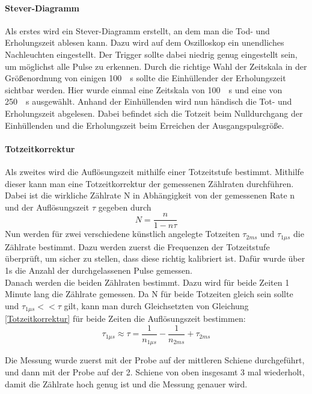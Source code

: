 \documentclass[12pt,a4paper]{article}
\begin{document}
\paragraph{Stever-Diagramm}
Als erstes wird ein Stever-Diagramm erstellt, an dem man die Tod- und Erholungszeit ablesen kann. Dazu wird auf dem Oszilloskop ein unendliches Nachleuchten eingestellt. Der Trigger sollte dabei niedrig genug eingestellt sein, um möglichst alle Pulse zu erkennen. Durch die richtige Wahl der Zeitskala in der Größenordnung von einigen \SI{100}{\mu s} sollte die Einhüllender der Erholungszeit sichtbar werden. Hier wurde einmal eine Zeitskala von \SI{100}{\mu s} und eine von \SI{250}{\mu s} ausgewählt. Anhand der Einhüllenden wird nun händisch die Tot- und Erholungszeit abgelesen. Dabei befindet sich die Totzeit beim Nulldurchgang der Einhüllenden und die Erholungszeit beim Erreichen der Ausgangspulsgröße. 

\paragraph{Totzeitkorrektur}
Als zweites wird die Auflösungszeit mithilfe einer Totzeitstufe bestimmt. Mithilfe dieser kann man eine Totzeitkorrektur der gemessenen Zählraten durchführen. Dabei ist die wirkliche Zählrate N in Abhängigkeit von der gemessenen Rate n und der Auflösungszeit $\tau$ gegeben durch 
\begin{equation}
\label{Totzeitkorrektur}
N = \dfrac{n}{1-n\tau}
\end{equation}
Nun werden für zwei verschiedene künstlich angelegte Totzeiten $\tau_{2ms}$ und $\tau_{1\mu s}$ die Zählrate bestimmt. Dazu werden zuerst die Frequenzen der Totzeitstufe überprüft, um sicher zu stellen, dass diese richtig kalibriert ist. Dafür wurde über 1s die Anzahl der durchgelassenen Pulse gemessen.\\
Danach werden die beiden Zählraten bestimmt. Dazu wird für beide Zeiten 1 Minute lang die Zählrate gemessen. Da N für beide Totzeiten gleich sein sollte und $\tau_{1\mu s} << \tau$ gilt, kann man durch Gleichsetzten von Gleichung \ref{Totzeitkorrektur} für beide Zeiten die Auflösungszeit bestimmen:
\begin{equation}
\tau_{1\mu s} \approx \tau = \dfrac{1}{n_{1\mu s}} - \dfrac{1}{n_{2ms}} + \tau_{2ms}
\label{Auslosungszeit}
\end{equation}

Die Messung wurde zuerst mit der Probe auf der mittleren Schiene durchgeführt, und dann mit der Probe auf der 2. Schiene von oben insgesamt 3 mal wiederholt, damit die Zählrate hoch genug ist und die Messung genauer wird.
\end{document}
